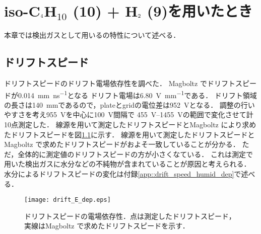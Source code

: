 \documentclass[../master]{subfiles}
\begin{document}
\chapter{iso-C$_{\text 4}$H$_{\text{10}}$ (10) + H$_{\text 2}$ (9)を用いたとき}
本章では検出ガスとして用いる\isoButaneHydro の特性について述べる．
\section{ドリフトスピード}
ドリフトスピードのドリフト電場依存性を調べた．
Magboltz でドリフトスピードが\SI{0.014}{\milli\metre\per\nano\second}となる
ドリフト電場は\SI{6.80}{\volt\per\milli\metre}である．
ドリフト領域の長さは\SI{140}{\milli\metre}であるので，plateとgridの電位差は\SI{952}{\volt}となる．
調整の行いやすさを考え\SI{955}{\volt}を中心に\SI{100}{\volt}間隔で
\SIrange{455}{1455}{\volt}の範囲で変化させて計10点測定した．
線源を用いて測定したドリフトスピードとMagboltz により求めたドリフトスピードを図\ref{fig::drift_speed_E_dep}に示す．
線源を用いて測定したドリフトスピードと Magboltz で求めたドリフトスピードがおよそ一致していることが分かる．
ただ，全体的に測定値のドリフトスピードの方が小さくなている．
これは測定で用いた検出ガスに水分などの不純物が含まれていることが原因と考えられる．
水分によるドリフトスピードの変化は付録\ref{app::drift_speed_humid_dep}で述べる．
\begin{figure}
  \centering
  \texttt{[image: drift\_E\_dep.eps]}
  \caption{ドリフトスピードの電場依存性．点は測定したドリフトスピード，実線はMagboltz で求めたドリフトスピードを示す．}
  \label{fig::drift_speed_E_dep}
\end{figure}
\end{document}
